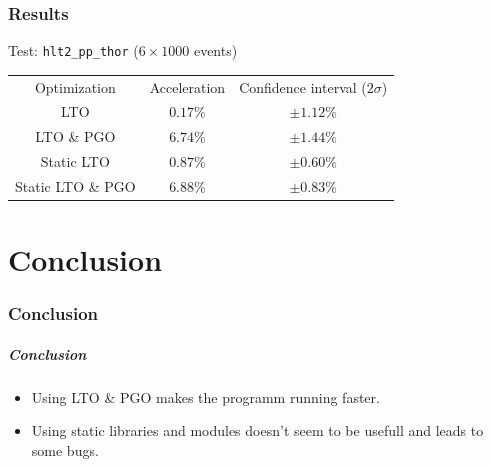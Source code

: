 \documentclass{beamer}
\begin{document}
\section{Results}

    \begin{frame}[fragile]
        Test: \verb'hlt2_pp_thor' ($6 \times 1000$ events)
        \begin{center}
            \begin{tabular}{ c c c }
                Optimization & Acceleration & Confidence interval ($2\sigma$) \\
                LTO & $0.17\%$ & $\pm 1.12\%$ \\
                LTO \& PGO & $6.74\%$ & $\pm 1.44\%$ \\
                Static LTO & $0.87\%$ & $\pm 0.60\%$ \\
                Static LTO \& PGO & $6.88\%$ & $\pm 0.83\%$
            \end{tabular}
        \end{center}
    \end{frame}

\part{Conclusion}
\section*{Conclusion}

    \begin{frame}
        \frametitle{Conclusion}

        \begin{itemize}
            \item Using LTO \& PGO makes the programm running faster.
            \item Using static libraries and modules doesn't seem to be usefull and leads to some bugs.
        \end{itemize}
    \end{frame}
\end{document}
